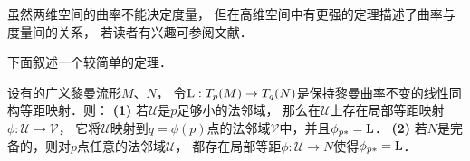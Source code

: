 虽然两维空间的曲率不能决定度量，
但在高维空间中有更强的定理描述了曲率与度量间的关系，
若读者有兴趣可参阅文献\parencite{Kulkarni-1970}．


下面叙述一个较简单的定理．


\begin{theorem}\label{chhss:thm_cartan-isometry}
    设有的广义黎曼流形$M$、$N$，
    令${\rm L }:T_p(M)\to T_q(N)$是保持黎曼曲率不变的线性同构等距映射．则：    
    {\bfseries (1)}  若$\mathscr{U}$是$p$足够小的法邻域，
    那么在$\mathscr{U}$上存在局部等距映射$\phi:\mathscr{U}\to \mathscr{V}$，
    它将$\mathscr{U}$映射到$q=\phi(p)$点的法邻域$\mathscr{V}$中，并且$\phi_{p*} = {\rm L}$．    
    {\bfseries (2)} 若$N$是完备的，则对$p$点任意的法邻域$\mathscr{U}$，
    都存在局部等距$\phi:\mathscr{U}\to N$使得$\phi_{p*} = {\rm L}$．
\end{theorem}
